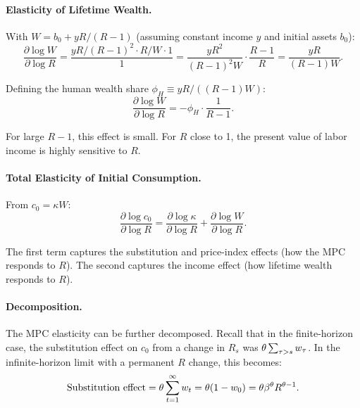 \paragraph{Elasticity of Lifetime Wealth.}
With $W = b_0 + yR/(R-1)$ (assuming constant income $y$ and initial assets $b_0$):
\begin{equation}
\frac{\partial \log W}{\partial \log R} = \frac{yR/(R-1)^2 \cdot R/W \cdot 1}{1} = \frac{y R^2}{(R-1)^2 W} \cdot \frac{R-1}{R} = \frac{yR}{(R-1)W}.
\label{eq:W-elasticity}
\end{equation}

Defining the human wealth share $\phi_H \equiv yR/((R-1)W)$:
\begin{equation}
\frac{\partial \log W}{\partial \log R} = -\phi_H \cdot \frac{1}{R - 1}.
\label{eq:W-elasticity-clean}
\end{equation}

For large $R - 1$, this effect is small. For $R$ close to 1, the present value of labor income is highly sensitive to $R$.

\paragraph{Total Elasticity of Initial Consumption.}
From $c_0 = \kappa W$:
\begin{equation}
\frac{\partial \log c_0}{\partial \log R} = \frac{\partial \log \kappa}{\partial \log R} + \frac{\partial \log W}{\partial \log R}.
\label{eq:c0-total-elasticity}
\end{equation}

The first term captures the substitution and price-index effects (how the MPC responds to $R$). The second captures the income effect (how lifetime wealth responds to $R$).

\paragraph{Decomposition.}
The MPC elasticity can be further decomposed. Recall that in the finite-horizon case, the substitution effect on $c_0$ from a change in $R_s$ was $\theta \sum_{\tau > s} w_\tau$. In the infinite-horizon limit with a permanent $R$ change, this becomes:
\begin{equation}
\text{Substitution effect} = \theta \sum_{t=1}^{\infty} w_t = \theta (1 - w_0) = \theta \beta^\theta R^{\theta - 1}.
\label{eq:substitution-infinity}
\end{equation}

